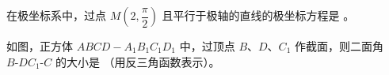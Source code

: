 \begin{question}
在极坐标系中，过点 $M\left(2,\dfrac{\pi}{2}\right)$ 且平行于极轴的直线的极坐标方程是 \gkblank{}。

\Needspace{0.4\textheight}
\end{question}
\begin{question}
如图，正方体 $ABCD-A_1B_1C_1D_1$ 中，过顶点 $B$、$D$、$C_1$ 作截面，则二面角 $B\text{-}DC_1\text{-}C$ 的大小是 \gkblank{}（用反三角函数表示）。
\nopagebreak[4]
\begin{center}\end{center}
\nopagebreak[4]
\end{question}

